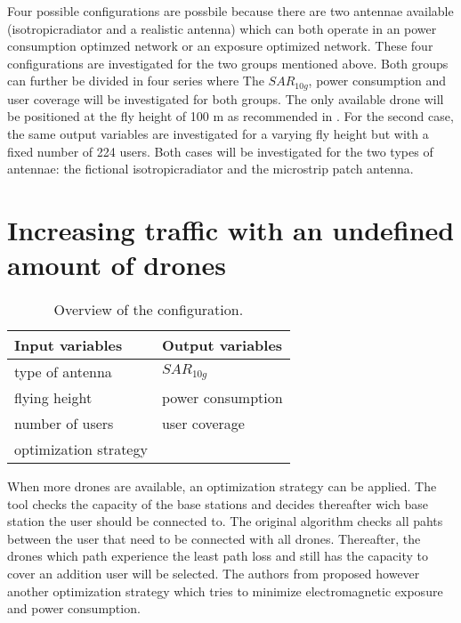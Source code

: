 Four possible configurations are possbile because there are two antennae available (\gls{isotropicradiator} and a realistic antenna) which can both operate in an power consumption optimzed network or an exposure optimized 
network. These four configurations are investigated for the two groups mentioned above.
Both groups can further be divided in four series where 
The $SAR_{10g}$, power consumption and user coverage will be investigated for both groups.
The only available drone will be positioned at the fly height of 100 m as recommended in \cite{J2}. For the second case, the same output variables are investigated 
for a varying fly height but with a fixed number of 224 users.
Both cases will be investigated for the two types of antennae: the fictional \gls{isotropicradiator} and the microstrip patch antenna.




\section{Increasing traffic with an undefined amount of drones}
\begin{table}[!htb]
      \centering
            \begin{tabular}{|l|l|}
            \hline
            \textbf{Input variables  }              & \textbf{Output variables}          \\   \hline 
            type of antenna                & $SAR_{10g}$               \\ 
            flying height                   & power consumption             \\ 
            number of users                & user coverage            \\ 
            optimization strategy           & \\
            \hline
            \end{tabular}
        \caption{Overview of the configuration.}
        \label{table:confOverviewScenario2}
\end{table}


When more drones are available, an optimization strategy can be applied. The tool checks the capacity of the base stations and decides thereafter
wich base station the user should be connected to. The original algorithm checks all pahts between the user that need to be connected with 
all drones. Thereafter, the drones which path experience the least path loss and still has the capacity to cover an addition user will be selected.
The authors from \cite{J1} proposed however another optimization strategy which tries to minimize electromagnetic exposure and 
power consumption.

